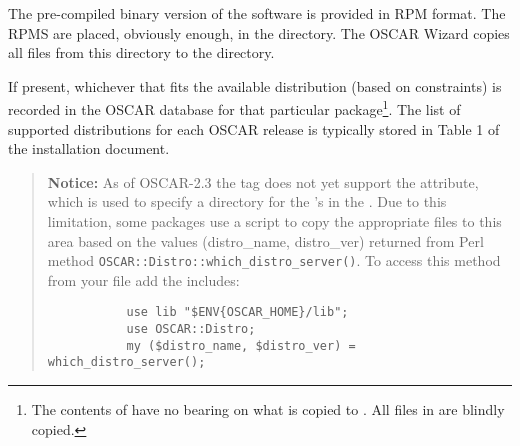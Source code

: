 The pre-compiled binary version of the software is provided in RPM format.
The RPMS are placed, obviously enough, in the  directory.
The OSCAR Wizard copies all files from this  directory to
the  directory.

% 

If present, whichever  that fits the available distribution
(based on  constraints) is recorded in the OSCAR database
for that particular package\footnote{The contents of  have
no bearing on what is copied to .  All files in
 are blindly copied.}.
The list of supported distributions for each OSCAR
release is typically stored in Table 1 of the installation document.



\begin{verse}
   {\bfseries Notice: } As of OSCAR-2.3 the  tag does not
   yet support the  attribute, which is used to specify a
   directory for the 's in the .  Due to this
   limitation, some packages use a  script to copy the
   appropriate files to this  area based on the values
   (distro\_name, distro\_ver) returned from Perl method
   \verb=OSCAR::Distro::which_distro_server()=.  To access this method from
   your  file add the includes: 
   \begin{footnotesize}
   \begin{verbatim}
           use lib "$ENV{OSCAR_HOME}/lib";
           use OSCAR::Distro;
           my ($distro_name, $distro_ver) = which_distro_server();
   \end{verbatim}
   \end{footnotesize}
\end{verse}




